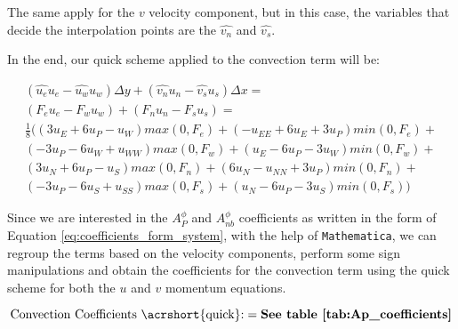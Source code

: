 The same apply for the $v$ velocity component, but in this case, the variables that decide the interpolation points are the $\hat{v_n}$ and $\hat{v_s}$.

In the end, our \acrshort{quick} scheme applied to the convection term will be:

\begin{gather}
    \left(\hat{u_e}u_e - \hat{u_w}u_w\right) \Delta y + \left(\hat{v_n}u_n - \hat{v_s}u_s\right) \Delta x = \\
    \left(F_e u_e - F_w u_w\right) + \left(F_n u_n - F_s u_s\right) = \\
    \frac{1}{8} (
    (3 u_{E} + 6 u_{P} - u_{W}) max(0, F_e) + (- u_{EE} + 6 u_{E} + 3 u_{P}) min(0, F_e) + \\
    (- 3 u_{P} - 6 u_{W} + u_{WW}) max(0, F_w) + (u_{E} - 6 u_{P} - 3 u_{W}) min(0, F_w) + \\
    (3 u_{N} + 6 u_{P} - u_{S}) max(0, F_n) + (6 u_{N} - u_{NN} + 3 u_{P}) min(0, F_n) + \\
    (- 3 u_{P} - 6 u_{S} + u_{SS}) max(0, F_s) + (u_{N} - 6 u_{P} - 3 u_{S}) min(0, F_s)
    )
\end{gather}

Since we are interested in the $A_P^\phi$ and $A_{nb}^\phi$ coefficients as written in the form of Equation \ref{eq:coefficients_form_system}, with the help of \texttt{Mathematica}, we can regroup the terms based on the velocity components, perform some sign manipulations and obtain the coefficients for the convection term using the \acrshort{quick} scheme for both the $u$ and $v$ momentum equations.

\begin{equation*}
    \text{Convection Coefficients \acrshort{quick}:} = { \textbf{See table \ref{tab:Ap_coefficients}} }
\end{equation*}










